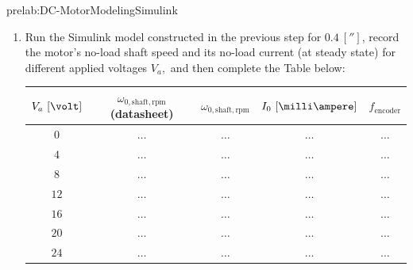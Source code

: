 \begin{prelab}{prelab:DC-MotorModelingSimulink}
\begin{enumerate}
\item Run the Simulink model constructed in the previous step for $0.4~[\second]$, record the motor's no-load shaft speed and its no-load current (at steady state) for different applied voltages $V_a,$ and then complete the Table below: %
%
  \begin{center}
    \begin{tabular}{c|c|c|c|c}
      \toprule
      $V_a~[\volt]$ &$\omega_{0,\mathrm{shaft,rpm}}$ (datasheet) &  $\omega_{0,\mathrm{shaft,rpm}}$ & $I_0~[\milli\ampere]$ & $f_{\mathrm{encoder}}$\\
      \toprule
      $0$ & $\ldots$ & $\ldots$& $\ldots$ & $\ldots$\\
      $4$ & $\ldots$ & $\ldots$& $\ldots$ & $\ldots$\\
      $8$ & $\ldots$ & $\ldots$& $\ldots$ & $\ldots$\\
      $12$ & $\ldots$ & $\ldots$& $\ldots$ & $\ldots$\\
      $16$ & $\ldots$ & $\ldots$& $\ldots$ & $\ldots$\\
      $20$ & $\ldots$ & $\ldots$& $\ldots$ & $\ldots$\\
      $24$ & $\ldots$ & $\ldots$& $\ldots$ & $\ldots$\\
      \bottomrule
    \end{tabular}    
  \end{center}  
\end{enumerate}

\end{prelab}
%
